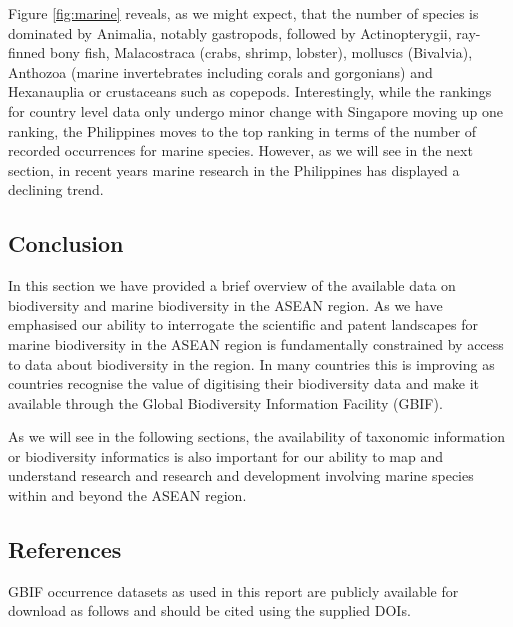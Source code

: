 \documentclass[]{book}
\theoremstyle{definition}
\theoremstyle{definition}
\theoremstyle{definition}
\theoremstyle{remark}
\begin{document}
Figure \ref{fig:marine} reveals, as we might expect, that the number of
species is dominated by Animalia, notably gastropods, followed by
Actinopterygii, ray-finned bony fish, Malacostraca (crabs, shrimp,
lobster), molluscs (Bivalvia), Anthozoa (marine invertebrates including
corals and gorgonians) and Hexanauplia or crustaceans such as copepods.
Interestingly, while the rankings for country level data only undergo
minor change with Singapore moving up one ranking, the Philippines moves
to the top ranking in terms of the number of recorded occurrences for
marine species. However, as we will see in the next section, in recent
years marine research in the Philippines has displayed a declining
trend.

\hypertarget{conclusion}{%
\subsection{Conclusion}\label{conclusion}}

In this section we have provided a brief overview of the available data
on biodiversity and marine biodiversity in the ASEAN region. As we have
emphasised our ability to interrogate the scientific and patent
landscapes for marine biodiversity in the ASEAN region is fundamentally
constrained by access to data about biodiversity in the region. In many
countries this is improving as countries recognise the value of
digitising their biodiversity data and make it available through the
Global Biodiversity Information Facility (GBIF).

As we will see in the following sections, the availability of taxonomic
information or biodiversity informatics is also important for our
ability to map and understand research and research and development
involving marine species within and beyond the ASEAN region.

\hypertarget{references}{%
\subsection{References}\label{references}}

GBIF occurrence datasets as used in this report are publicly available
for download as follows and should be cited using the supplied DOIs.
\end{document}
